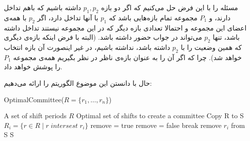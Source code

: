 \documentclass[]{article}
\begin{document}
مسئله را با این فرض حل می‌کنیم که اگر دو بازه $p_1, p_2$ داشته باشیم که باهم تداخل دارند،
و $P_1$ مجموعه تمام بازه‌هایی باشد که $p_1$ با آنها تداخل دارد،
اگر $p_2$ با همه‌ی اعضای این مجموعه و احتمالا تعدادی بازه دیگر که در این مجموعه نیستند
تداخل داشته باشد، تنها $p_2$ می‌تواند در جواب حضور داشته باشد.
(البته با فرض اینکه بازه‌ی دیگری که همین وضعیت را با $p_2$ داشته باشد، نداشته باشیم،
در غیر اینصورت آن بازه انتخاب خواهد شد).
چرا که اگر آن را به عنوان بازه‌ی ناظر در نظر بگیریم همه‌ی مجموعه $P_1$ را پوشش خواهد داد.

حال با دانستن این موضوع الگوریتم را ارائه می‌دهیم:
\begin{latin}
    \begin{algorithm}[H]
        \caption*{OptimalCommittee($R = \lbrace r_1, \ldots, r_n \rbrace$)}
        \begin{algorithmic}
            \Require A set of shift periods $R$
            \Ensure Optimal set of shifts to create a committee
            \State Copy R to S
                \State $R_i = \lbrace r \in R \; | \; r \; intersest \; r_i \rbrace$
                \State remove = true
                            \State remove = false
                            \State break
                        \EndIf
                    \EndFor
                \EndFor
                    \State remove $r_i$ from S
                \EndIf
            \EndFor
            \State \Return S
        \end{algorithmic}
    \end{algorithm}
\end{latin}
\end{document}
